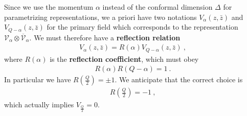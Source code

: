 \documentclass[12pt,a4paper,notitlepage]{report}
\numberwithin{equation}{section}
\theoremstyle{break}
\begin{document}
Since we
use the momentum $\alpha$ instead of the conformal dimension $\Delta$ for parametrizing representations, we a priori have two notations $V_\alpha(z,\bar{z})$ and $V_{Q-\alpha}(z,\bar{z})$ for the primary field which corresponds to the representation $\mathcal{V}_\alpha \otimes \overline{\mathcal{V}}_\alpha$. We must therefore have a \textbf{\boldmath reflection relation}
\begin{align}
 \boxed{V_\alpha(z,\bar{z})= R(\alpha) V_{Q-\alpha}(z,\bar{z})}\ ,
\label{vrv}
\end{align}
where $R(\alpha)$ is the \textbf{\boldmath reflection coefficient}, which must obey 
\begin{align}
 R(\alpha)R(Q-\alpha)=1\ .
\label{rrr}
\end{align}
In particular we have $R(\frac{Q}{2})=\pm 1$. We anticipate that the correct choice is 
\begin{align}
 R(\tfrac{Q}{2}) = -1\ ,
\label{rqt}
\end{align}
which actually implies $V_{\frac{Q}{2}}=0$. 
\end{document}
